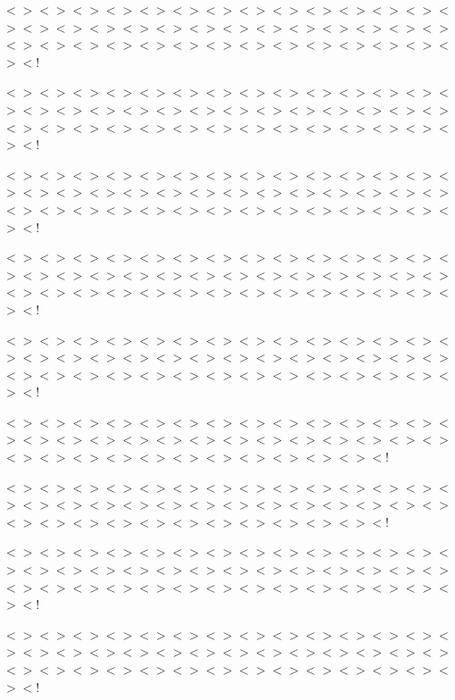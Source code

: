 $<$$>$$<$$>$$<$$>$$<$$>$$<$$>$$<$$>$$<$$>$$<$$>$$<$$>$$<$$>$$<$$>$$<$$>$$<$$>$$<$$>$$<$$>$$<$$>$$<$$>$$<$$>$$<$$>$$<$$>$$<$$>$$<$$>$$<$$>$$<$$>$$<$$>$$<$$>$$<$$>$$<$$>$$<$$>$$<$$>$$<$$>$$<$$>$$<$$>$$<$$>$$<$$>$$<$$>$$<$$>$$<$$>$$<$$>$$<$$>$$<$$>$$<$!

$<$$>$$<$$>$$<$$>$$<$$>$$<$$>$$<$$>$$<$$>$$<$$>$$<$$>$$<$$>$$<$$>$$<$$>$$<$$>$$<$$>$$<$$>$$<$$>$$<$$>$$<$$>$$<$$>$$<$$>$$<$$>$$<$$>$$<$$>$$<$$>$$<$$>$$<$$>$$<$$>$$<$$>$$<$$>$$<$$>$$<$$>$$<$$>$$<$$>$$<$$>$$<$$>$$<$$>$$<$$>$$<$$>$$<$$>$$<$$>$$<$$>$$<$!

$<$$>$$<$$>$$<$$>$$<$$>$$<$$>$$<$$>$$<$$>$$<$$>$$<$$>$$<$$>$$<$$>$$<$$>$$<$$>$$<$$>$$<$$>$$<$$>$$<$$>$$<$$>$$<$$>$$<$$>$$<$$>$$<$$>$$<$$>$$<$$>$$<$$>$$<$$>$$<$$>$$<$$>$$<$$>$$<$$>$$<$$>$$<$$>$$<$$>$$<$$>$$<$$>$$<$$>$$<$$>$$<$$>$$<$$>$$<$$>$$<$$>$$<$!

$<$$>$$<$$>$$<$$>$$<$$>$$<$$>$$<$$>$$<$$>$$<$$>$$<$$>$$<$$>$$<$$>$$<$$>$$<$$>$$<$$>$$<$$>$$<$$>$$<$$>$$<$$>$$<$$>$$<$$>$$<$$>$$<$$>$$<$$>$$<$$>$$<$$>$$<$$>$$<$$>$$<$$>$$<$$>$$<$$>$$<$$>$$<$$>$$<$$>$$<$$>$$<$$>$$<$$>$$<$$>$$<$$>$$<$$>$$<$$>$$<$$>$$<$!

$<$$>$$<$$>$$<$$>$$<$$>$$<$$>$$<$$>$$<$$>$$<$$>$$<$$>$$<$$>$$<$$>$$<$$>$$<$$>$$<$$>$$<$$>$$<$$>$$<$$>$$<$$>$$<$$>$$<$$>$$<$$>$$<$$>$$<$$>$$<$$>$$<$$>$$<$$>$$<$$>$$<$$>$$<$$>$$<$$>$$<$$>$$<$$>$$<$$>$$<$$>$$<$$>$$<$$>$$<$$>$$<$$>$$<$$>$$<$$>$$<$$>$$<$!

$<$$>$$<$$>$$<$$>$$<$$>$$<$$>$$<$$>$$<$$>$$<$$>$$<$$>$$<$$>$$<$$>$$<$$>$$<$$>$$<$$>$$<$$>$$<$$>$$<$$>$$<$$>$$<$$>$$<$$>$$<$$>$$<$$>$$<$$>$$<$$>$$<$$>$$<$$>$$<$$>$$<$$>$$<$$>$$<$$>$$<$$>$$<$$>$$<$$>$$<$$>$$<$$>$$<$$>$$<$$>$$<$$>$$<$!

$<$$>$$<$$>$$<$$>$$<$$>$$<$$>$$<$$>$$<$$>$$<$$>$$<$$>$$<$$>$$<$$>$$<$$>$$<$$>$$<$$>$$<$$>$$<$$>$$<$$>$$<$$>$$<$$>$$<$$>$$<$$>$$<$$>$$<$$>$$<$$>$$<$$>$$<$$>$$<$$>$$<$$>$$<$$>$$<$$>$$<$$>$$<$$>$$<$$>$$<$$>$$<$$>$$<$$>$$<$$>$$<$$>$$<$!

$<$$>$$<$$>$$<$$>$$<$$>$$<$$>$$<$$>$$<$$>$$<$$>$$<$$>$$<$$>$$<$$>$$<$$>$$<$$>$$<$$>$$<$$>$$<$$>$$<$$>$$<$$>$$<$$>$$<$$>$$<$$>$$<$$>$$<$$>$$<$$>$$<$$>$$<$$>$$<$$>$$<$$>$$<$$>$$<$$>$$<$$>$$<$$>$$<$$>$$<$$>$$<$$>$$<$$>$$<$$>$$<$$>$$<$$>$$<$$>$$<$$>$$<$!

$<$$>$$<$$>$$<$$>$$<$$>$$<$$>$$<$$>$$<$$>$$<$$>$$<$$>$$<$$>$$<$$>$$<$$>$$<$$>$$<$$>$$<$$>$$<$$>$$<$$>$$<$$>$$<$$>$$<$$>$$<$$>$$<$$>$$<$$>$$<$$>$$<$$>$$<$$>$$<$$>$$<$$>$$<$$>$$<$$>$$<$$>$$<$$>$$<$$>$$<$$>$$<$$>$$<$$>$$<$$>$$<$$>$$<$$>$$<$$>$$<$$>$$<$! 


